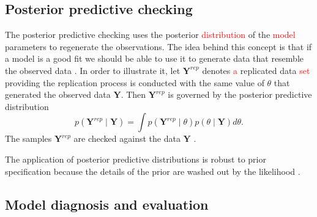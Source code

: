 \documentclass[a4paper]{article}   	%
\begin{document}
	
	\subsection{Posterior predictive checking}
	
	
	The posterior predictive checking uses the posterior \textcolor{red}{distribution} of the \textcolor{red}{model} parameters to regenerate the observations. The idea behind this concept is that if a model is a good fit we should be able to use it to generate data that resemble the observed data \parencite{gabry2019Visualization}. In order to illustrate it, let $\bm{Y}^{rep}$ denotes \textcolor{red}{a} replicated data \textcolor{red}{set} providing the replication process is conducted with the same value of $\theta$ that generated the observed data $\bm{Y}$. Then $\bm{Y}^{rep}$ is governed by the posterior predictive distribution 
	\begin{equation}
		p(\bm{Y}^{rep} \mid \bm{Y}) = \int p(\bm{Y}^{rep} \mid \theta)p(\theta \mid \bm{Y}) d\theta. 
	\end{equation}
	The samples $\bm{Y}^{rep}$ are checked against the data $\bm{Y}$ \parencite{dipakdey2005Bayesian, Congdon2019Bayesian}. 
	
	
	The application of posterior predictive distributions is robust to prior specification because the details of the prior are washed out by the likelihood \parencite{gelman2017Prior}.
	
	
	
	\subsection{Model diagnosis and evaluation}
	
\end{document}
